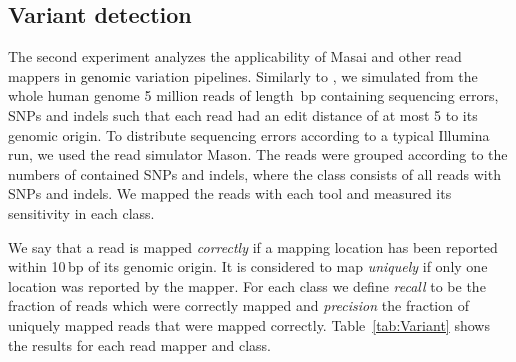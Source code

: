 \documentclass[a4,center,fleqn]{article}
\begin{document}
\subsection{Variant detection}

The second experiment analyzes the applicability of Masai and other read mappers in \textcolor{black}{genomic} variation pipelines.
Similarly to \cite{Shrimp2}, we simulated from the whole human genome 5 million reads of length \,bp containing sequencing errors, SNPs and indels such that each read had an edit distance of at most 5 to its genomic origin.
To distribute sequencing errors according to a typical Illumina run, we used the read simulator Mason.
The reads were grouped according to the numbers of contained SNPs and indels, where the class  consists of all reads with  SNPs and  indels.
We mapped the reads with each tool and measured its sensitivity in each class.

We say that a read is mapped \emph{correctly} if a mapping location has been reported within 10\,bp of its genomic origin.
It is considered to map \emph{uniquely} if only one location was reported by the mapper.
For each class we define \emph{recall} to be the fraction of reads which were correctly mapped and \emph{precision} the fraction of uniquely mapped reads that were mapped correctly.
Table~\ref{tab:Variant} shows the results for each read mapper and class.
\end{document}
